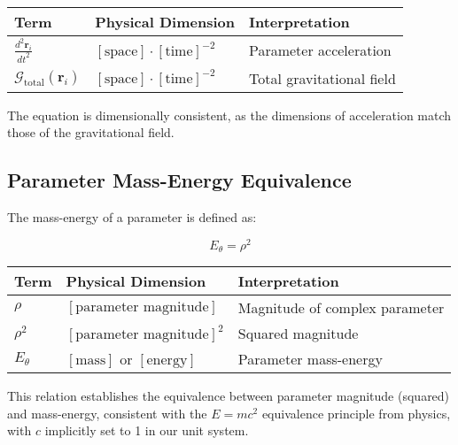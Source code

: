 \begin{center}
\label{tab:dimensional_analysis_parameter_trajectory}
\begin{tabular}{p{3cm} p{5cm} p{6cm}}
\textbf{Term} & \textbf{Physical Dimension} & \textbf{Interpretation} \\
\hline
$\frac{d^2\mathbf{r}_i}{dt^2}$ & $[\text{space}] \cdot [\text{time}]^{-2}$ & Parameter acceleration \\
$\mathcal{G}_{\text{total}}(\mathbf{r}_i)$ & $[\text{space}] \cdot [\text{time}]^{-2}$ & Total gravitational field \\
\hline
\end{tabular}
\end{center}

The equation is dimensionally consistent, as the dimensions of acceleration match those of the gravitational field.

\subsection{Parameter Mass-Energy Equivalence}

The mass-energy of a parameter is defined as:

\begin{equation}
E_{\theta} = \rho^2
\end{equation}

\begin{center}
\label{tab:dimensional_analysis_mass_energy}
\begin{tabular}{p{3cm} p{5cm} p{6cm}}
\textbf{Term} & \textbf{Physical Dimension} & \textbf{Interpretation} \\
\hline
$\rho$ & $[\text{parameter magnitude}]$ & Magnitude of complex parameter \\
$\rho^2$ & $[\text{parameter magnitude}]^2$ & Squared magnitude \\
$E_{\theta}$ & $[\text{mass}]$ or $[\text{energy}]$ & Parameter mass-energy \\
\hline
\end{tabular}
\end{center}

This relation establishes the equivalence between parameter magnitude (squared) and mass-energy, consistent with the $E = mc^2$ equivalence principle from physics, with $c$ implicitly set to 1 in our unit system.

